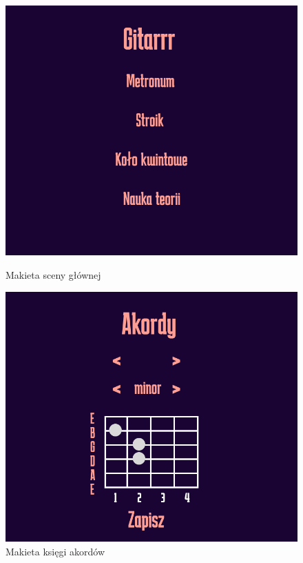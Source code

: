 \begin{figure}[htb]
    \centering
    \begin{minipage}[b]{0.4\textwidth}
        \centering
        \includegraphics[width=0.9\linewidth]{rys03/MakMain}
        \caption{Makieta sceny głównej}
        \label{fig:pageLayout1}
    \end{minipage}
    \hspace{0.05\textwidth}
    \begin{minipage}[b]{0.4\textwidth}
        \centering
        \includegraphics[width=0.9\linewidth]{rys03/MakAkordy}
        \caption{Makieta księgi akordów}
        \label{fig:pageLayout2}
    \end{minipage}
    

\end{figure}
